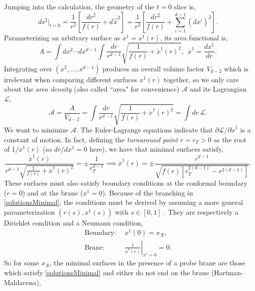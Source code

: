 \documentclass[12pt,a4paper]{article}
\begin{document}
Jumping into the calculation, the geometry of the $t = 0$ slice is,
\begin{equation}
ds^2|_{t=0} = \frac{1}{r^2}\left[\frac{dr^2}{f(r)} + d\vec{x}^2\right] = \frac{1}{r^2}\left[\frac{dr^2}{f(r)} + \sum_{i=1}^{d-1} (dx^i)^2\right].
\end{equation}
Parameterizing an arbitrary surface as $x^1 = x^1(r)$, its area functional is,
\begin{equation}
A = \int dx^2 \cdots dx^{d-1} \int \frac{dr}{r^{d-1}}\sqrt{\frac{1}{f(r)} + \dot{x}^1(r)^2},\ \ \dot{x}^1 = \frac{dx^1}{dr}.
\end{equation}
Integrating over $(x^2,...,x^{d-1})$ produces an overall volume factor $V_{d-2}$ which is irrelevant when comparing different surfaces $x^1(r)$ together, so we only care about the \textit{area density} (also called ``area" for convenience) $\mathcal{A}$ and its Lagrangian $\mathcal{L}$,
\begin{equation}
\mathcal{A} = \frac{A}{V_{d-2}} = \int \frac{dr}{r^{d-1}}\sqrt{\frac{1}{f(r)} + \dot{x}^1(r)^2} = \int dr\,\mathcal{L}.\label{area}
\end{equation}
We want to minimize $\mathcal{A}$. The Euler-Lagrange equations indicate that $\partial\mathcal{L}/\partial\dot{x}^1$ is a constant of motion. In fact, defining the \textit{turnaround point} $r = r_T > 0$ as the root of $1/\dot{x}^1(r)$ (so $dr/dx^1 = 0$ here), we have that minimal surfaces satisfy,
\begin{equation}
\frac{\dot{x}^1(r)}{r^{d-1}\sqrt{\frac{1}{f(r)} + \dot{x}^1(r)^2}} = \pm\frac{1}{r_{T}^{d-1}} \implies \dot{x}^1(r) = \pm\frac{r^{d-1}}{\sqrt{f(r)\left[r_T^{2(d-1)} - r^{2(d-1)}\right]}}.\label{solutionsMinimal}
\end{equation}
These surfaces must also satisfy boundary conditions at the conformal boundary ($r = 0$) and at the brane ($x^1 = 0$). Because of the branching in \eqref{solutionsMinimal}, the conditions must be derived by assuming a more general parameterization $(r(s),x^1(s))$ with $s \in [0,1]$ \cite{Geng:2020fxl}. They are respectively a Dirichlet condition and a Neumann condition,
\begin{align}
\text{Boundary:}&\ \ x^1(0) = x_\mathcal{R},\\
\text{Brane:}&\ \ \left.\frac{1}{\dot{x}^1(r)}\right|_{x^1 = 0} = 0.
\end{align}
So for some $x_\mathcal{R}$, the minimal surfaces in the presence of a probe brane are those which satisfy \eqref{solutionsMinimal} and either do not end on the brane (Hartman-Maldacena),
\end{document}
